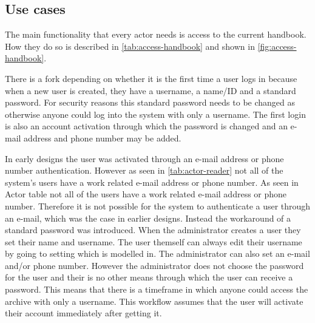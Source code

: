 \subsection{Use cases} \label{sec:usecases}
The main functionality that every actor needs is access to the current handbook. How they do so is described in \cref{tab:access-handbook} and shown in \cref{fig:access-handbook}.





There is a fork depending on whether it is the first time a user logs in because when a new user is created, they have a username, a name/ID and a standard password.
For security reasons this standard password needs to be changed as otherwise anyone could log into the system with only a username.
The first login is also an account activation through which the password is changed and an e-mail address and phone number may be added.





%





%

In early designs the user was activated through an e-mail address or phone number authentication.
However as seen in \cref{tab:actor-reader} not all of the system's users have a work related e-mail address or phone number.
As seen in Actor table not all of the users have a work related e-mail address or phone number.
Therefore it is not possible for the system to authenticate a user through an e-mail, which was the case in earlier designs.
Instead the workaround of a standard password was introduced.
When the administrator creates a user they set their name and username.
The user themself can always edit their username by going to setting which is modelled in.
The administrator can also set an e-mail and/or phone number.
However the administrator does not choose the password for the user and their is no other means through which the user can receive a password.
This means that there is a timeframe in which anyone could access the archive with only a username.
This workflow assumes that the user will activate their account immediately after getting it.

